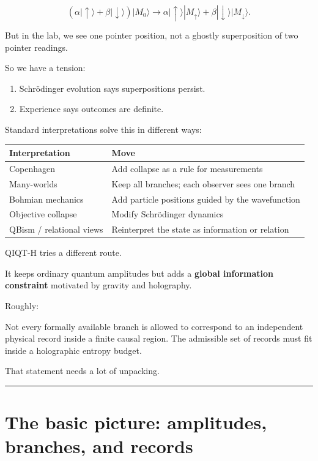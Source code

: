 \documentclass[11pt,a4paper]{article}
\newenvironment{qiqtquote}{\begin{mdframed}[style=quotestyle]}{\end{mdframed}}
\begin{document}
\[
(\alpha|\uparrow\rangle+\beta|\downarrow\rangle)|M_0\rangle
\longrightarrow
\alpha|\uparrow\rangle|M_\uparrow\rangle
+
\beta|\downarrow\rangle|M_\downarrow\rangle.
\]

But in the lab, we see one pointer position, not a ghostly superposition of two pointer readings.

So we have a tension:

\begin{enumerate}
  \item Schrödinger evolution says superpositions persist.
  \item Experience says outcomes are definite.
\end{enumerate}

Standard interpretations solve this in different ways:

\begin{center}
\small
\begin{tabularx}{\linewidth}{|Y|Y|}
\hline
\textbf{Interpretation} & \textbf{Move} \\
\hline
Copenhagen & Add collapse as a rule for measurements \\
\hline
Many-worlds & Keep all branches; each observer sees one branch \\
\hline
Bohmian mechanics & Add particle positions guided by the wavefunction \\
\hline
Objective collapse & Modify Schrödinger dynamics \\
\hline
QBism / relational views & Reinterpret the state as information or relation \\
\hline
\end{tabularx}
\end{center}

QIQT-H tries a different route.

It keeps ordinary quantum amplitudes but adds a \textbf{global information constraint} motivated by gravity and holography.

Roughly:

\begin{qiqtquote}
Not every formally available branch is allowed to correspond to an independent physical record inside a finite causal region. The admissible set of records must fit inside a holographic entropy budget.
\end{qiqtquote}

That statement needs a lot of unpacking.

\medskip\hrule\medskip

\section{The basic picture: amplitudes, branches, and records}
\end{document}
